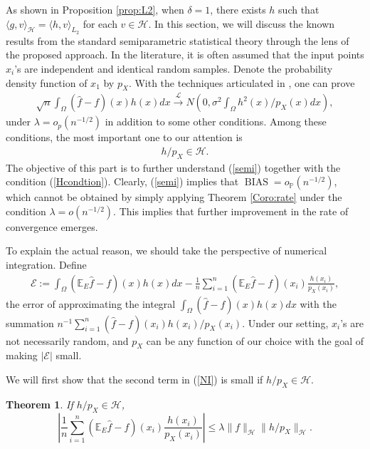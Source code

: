 \documentclass[12pt]{article}
\theoremstyle{plain}
\newtheorem{theorem}{Theorem}
\theoremstyle{remark}
\begin{document}
As shown in Proposition \ref{prop:L2}, when $\delta=1$, there exists $h$ such that $\langle g,v\rangle_{\mathcal{H}}=\langle h,v\rangle_{L_2}$ for each $v\in\mathcal{H}$. In this section, we will discuss the known results from the standard semiparametric statistical theory through the lens of the proposed approach. In the literature, it is often assumed that the input points $x_i$'s are independent and identical random samples. Denote the probability density function of $x_1$ by $p_X$. With the techniques articulated in \cite{mammen1997penalized,tuo2015efficient}, one can prove 
\begin{eqnarray}\label{semi}
    \sqrt{n}\int_\Omega (\hat{f}-f)(x)h(x)dx\xrightarrow{\mathscr{L}} N\left(0,\sigma^2\int_\Omega h^2(x)/p_X(x)dx\right),
\end{eqnarray}
under $\lambda=o_p(n^{-1/2})$ in addition to some other conditions. Among these conditions, the most important one to our attention is 
\begin{eqnarray}\label{Hcondtion}
    h/p_X\in\mathcal{H}.
\end{eqnarray}
The objective of this part is to further understand (\ref{semi}) together with the condition (\ref{Hcondtion}).
Clearly, (\ref{semi}) implies that $\operatorname{BIAS}=o_\mathbb{P}(n^{-1/2})$, which cannot be obtained by simply applying Theorem \ref{Coro:rate} under the condition $\lambda=o(n^{-1/2})$. This implies that further improvement in the rate of convergence emerges. %

To explain the actual reason, we should take the perspective of numerical integration. Define
\begin{eqnarray}\label{NI}
    \mathscr{E}:=\int_\Omega (\mathbb{E}_E\hat{f}-f)(x)h(x)dx-\frac{1}{n}\sum_{i=1}^n (\mathbb{E}_E\hat{f}-f)(x_i)\frac{h(x_i)}{p_X(x_i)},
\end{eqnarray}
the error of approximating the integral $\int_\Omega (\hat{f}-f)(x)h(x)dx$ with the summation $n^{-1}\sum_{i=1}^n (\hat{f}-f)(x_i)h(x_i)/p_X(x_i)$. Under our setting, $x_i$'s are not necessarily random, and $p_X$ can be any function of our choice with the goal of making $|\mathscr{E}|$ small. 

We will first show that the second term in (\ref{NI}) is small if $h/p_X\in\mathcal{H}$.

\begin{theorem}\label{Prop:semi}
    If $h/p_X\in\mathcal{H}$,
    \[\left|\frac{1}{n}\sum_{i=1}^n (\mathbb{E}_E\hat{f}-f)(x_i)\frac{h(x_i)}{p_X(x_i)}\right|\leq \lambda \|f\|_\mathcal{H}\|h/p_X\|_{\mathcal{H}}.\]
\end{theorem}
\end{document}
